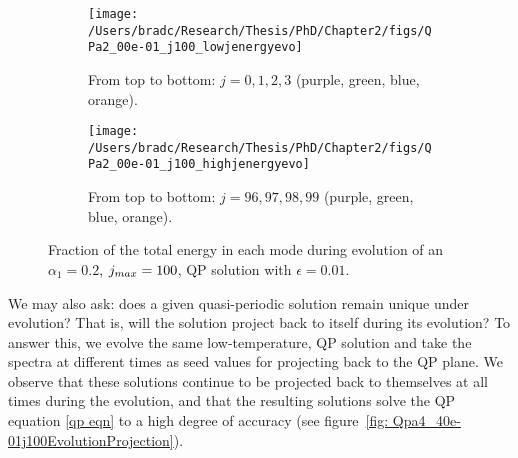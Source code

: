 \documentclass[../PhD.tex]{subfiles}
\begin{document}
\begin{figure}[ht]
	\centering
	\begin{subfigure}[t]{0.45\textwidth}
		\texttt{[image: /Users/bradc/Research/Thesis/PhD/Chapter2/figs/QPa2\_00e-01\_j100\_lowjenergyevo]}
		\caption{From top to bottom: $j=0, 1, 2, 3$ (purple, green, blue, orange).}
	\end{subfigure}
	\;
	\begin{subfigure}[t]{0.45\textwidth}
		\texttt{[image: /Users/bradc/Research/Thesis/PhD/Chapter2/figs/QPa2\_00e-01\_j100\_highjenergyevo]}
		\caption{From top to bottom: $j=96, 97, 98, 99$ (purple, green, blue, orange).}
	\end{subfigure}
	\caption[Evolution of QP solutions at low temperature]{Fraction of the total energy in each mode during evolution of an $\alpha_1 = 0.2$, $j_{max} = 100$, QP solution with $\epsilon=0.01$.}
	\label{fig:qpevo}
\end{figure}



We may also ask: does a given quasi-periodic solution remain unique under evolution? That is, will the solution project back to itself during its evolution? To answer this, we evolve the same low-temperature, QP solution and take the spectra at different times as seed values for projecting back to the QP plane. We observe that these solutions continue to be projected back to themselves at all times during the evolution, and that the resulting solutions solve the QP equation \eqref{qp eqn} to a high degree of accuracy (see figure~\ref{fig: Qpa4_40e-01j100EvolutionProjection}). 
\end{document}
